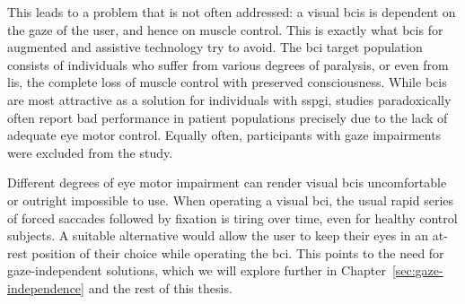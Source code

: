 This leads to a problem that is not often addressed:
a visual \acp{bci} is dependent on the gaze of the user, and hence on
muscle control.
This is exactly what \acp{bci} for augmented and assistive technology try to
avoid.
The \ac{bci} target population consists of individuals who suffer from various
degrees of paralysis, or even from \ac{lis}, the complete loss of muscle
control with preserved consciousness.
While \ac{bci}s are most attractive as a solution for individuals with
\ac{sspgi}, studies
paradoxically often report bad performance in patient populations precisely due
to the lack of adequate eye motor control.
Equally often, participants with gaze impairments were excluded from the study.

Different degrees of eye motor impairment can render visual \ac{bci}s
uncomfortable or outright impossible to use.
When operating a visual \ac{bci}, the usual rapid series of forced saccades
followed by fixation is tiring over time, even for healthy control subjects.
A suitable alternative would allow the user to keep their eyes in an at-rest
position of their choice while operating the \ac{bci}.
This points to the need for gaze-independent solutions, which we will explore
further in Chapter~\ref{sec:gaze-independence} and the rest of this thesis.

